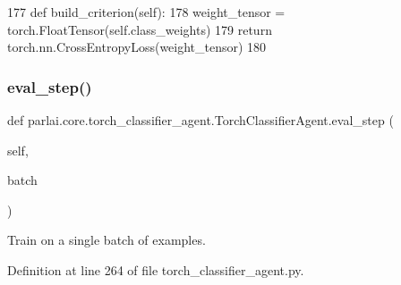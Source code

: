 \begin{DoxyCode}
177     \textcolor{keyword}{def }build\_criterion(self):
178         weight\_tensor = torch.FloatTensor(self.class\_weights)
179         \textcolor{keywordflow}{return} torch.nn.CrossEntropyLoss(weight\_tensor)
180 
\end{DoxyCode}
\mbox{\label{classparlai_1_1core_1_1torch__classifier__agent_1_1TorchClassifierAgent_a5d456df843180fb32ca574dc2a33cc80}} 
\subsubsection{\texorpdfstring{eval\+\_\+step()}{eval\_step()}}
{\footnotesize\ttfamily def parlai.\+core.\+torch\+\_\+classifier\+\_\+agent.\+Torch\+Classifier\+Agent.\+eval\+\_\+step (\begin{DoxyParamCaption}\item[{}]{self,  }\item[{}]{batch }\end{DoxyParamCaption})}

\begin{DoxyVerb}Train on a single batch of examples.
\end{DoxyVerb}
 

Definition at line 264 of file torch\+\_\+classifier\+\_\+agent.\+py.



